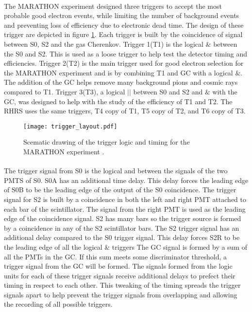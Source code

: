 \paragraph{} The MARATHON experiment designed three triggers to accept the most probable good electron events, while limiting the number of background events and preventing loss of efficiency due to electronic dead time. The design of these trigger are depicted in figure \ref{fig:trig_layout}. Each trigger is built by the coincidence of signal between S0, S2 and the gas Cherenkov.  Trigger 1(T1) is the logical $\&$ between the S0 and S2. This is used as a loose trigger to help test the detector timing and efficiencies.  Trigger 2(T2) is the main trigger used for good electron selection for the MARATHON experiment and is by  combining T1 and GC with a logical $\&$. The addition of the GC helps remove many background pions and cosmic rays compared to T1. Trigger 3(T3), a logical $||$ between S0 and S2 and $\&$ with the GC, was designed to help with the study of the efficiency of T1 and T2. The RHRS uses the same triggers, T4 copy of T1, T5 copy of T2, and T6 copy of T3.
\begin{figure}[t!]
	\texttt{[image: trigger\_layout.pdf]}
	\caption{Scematic drawing of the trigger logic and timing for the MARATHON experiment \cite{flo_trig}.}
	\label{fig:trig_layout}
\end{figure}
\paragraph{}The trigger signal from  S0 is the logical and between the signals of the two PMTS of S0. S0A has an additional time delay. This delay forces the leading edge of S0B to be the leading edge of the output of the S0 coincidence. The trigger signal for S2 is built by a coincidence in both the left and right PMT attached to each bar of the scintillator. The signal from the right PMT is used as the leading edge of the coincidence signal. S2 has many bars so the trigger source is formed by a coincidence in any of the S2 scintillator bars. The S2 trigger signal has an additional delay compared to the S0 trigger signal. This delay forces S2R to be the leading edge of all the logical $\&$ triggers The GC signal is formed by a sum of all the PMTs in the GC. If this sum meets some discriminator threshold, a trigger signal from the GC will be formed. The signals formed from the logic units for each of these trigger signals receive additional delays to prefect their timing in respect to each other. This tweaking of the timing spreads the trigger signals apart to help prevent the trigger signals from overlapping and allowing the recording of all possible triggers. 
 
